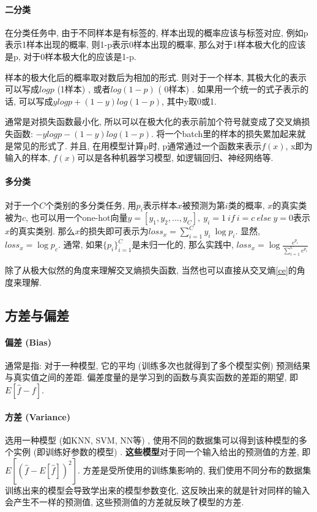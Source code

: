 \paragraph{二分类}
在分类任务中, 由于不同样本是有标签的, 样本出现的概率应该与标签对应, 例如p表示1样本出现的概率, 则1-p表示0样本出现的概率, 那么对于1样本极大化的应该是p, 对于0样本极大化的应该是1-p. 

样本的极大化后的概率取对数后为相加的形式. 则对于一个样本, 其极大化的表示可以写成$log p$  (1样本) , 或者$log(1-p)$ ( 0样本) . 如果用一个统一的式子表示的话, 可以写成$y log p + (1-y) log(1-p)$, 其中y取0或1. 

通常是对损失函数最小化, 所以可以在极大化的表示前加个符号就变成了交叉熵损失函数: $- y log p - (1-y) log(1-p)$. 将一个batch里的样本的损失累加起来就是常见的形式了. 并且, 在用模型计算p时, p通常通过一个函数来表示$f(x)$, x即为输入的样本, $f(x)$可以是各种机器学习模型, 如逻辑回归、神经网络等. 


\paragraph{多分类}
对于一个$C$个类别的多分类任务, 用$p_i$表示样本$x$被预测为第$i$类的概率, $x$的真实类被为$c$, 也可以用一个one-hot向量$y = [y_1, y_2, ..., y_C],\ y_i = 1\ if\ i = c\ else\ y = 0$表示$x$的真实类别. 那么$x$的损失即可表示为$loss_x = \sum_{i=1}^C y_i\ \log p_i$. 显然, $loss_x = \log p_c$. 通常, 如果$\{p_i\}_{i=1}^C$是未归一化的, 那么实践中, $loss_x = \log \frac{e^{p_c}}{\sum_{i=1}^C e^{p_i}}$

除了从极大似然的角度来理解交叉熵损失函数, 当然也可以直接从交叉熵\ref{ce}的角度来理解. 

\subsection{方差与偏差}
\paragraph{偏差 (Bias) }通常是指: 对于一种模型, 它的平均 (训练多次也就得到了多个模型实例) 预测结果与真实值之间的差距. 偏差度量的是学习到的函数与真实函数的差距的期望, 即$E[\hat{f} - f]$. 

\paragraph{方差 (Variance) }选用一种模型 (如KNN, SVM, NN等) , 使用不同的数据集可以得到该种模型的多个实例 (即训练好参数的模型) . \textbf{这些模型}对于同一个输入给出的预测值的方差, 即$E[(\hat{f} - E[\hat{f}])^2]$. 方差是受所使用的训练集影响的, 我们使用不同分布的数据集训练出来的模型会导致学出来的模型参数变化, 这反映出来的就是针对同样的输入会产生不一样的预测值, 这些预测值的方差就反映了模型的方差. 

